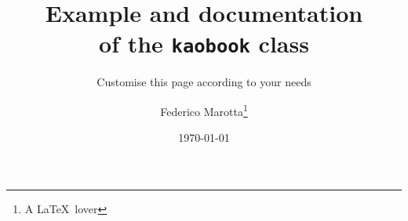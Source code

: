 \documentclass[
  6in,9in,         %
  fontsize=10pt,
  twoside=true,
  numbers=noenddot
]{kaobook}
\begin{document}

\titlehead{The \texttt{kaobook} class}
\subject{Use this document as a template}

\title[Example and documentation of the {\normalfont\texttt{kaobook}} class]{Example and documentation \\ of the {\normalfont\texttt{kaobook}} class}
\subtitle{Customise this page according to your needs}

\author[Federico Marotta]{Federico Marotta\thanks{A \LaTeX\ lover}}

\date{\today}

\publishers{An Awesome Publisher}


\frontmatter %




\makeatletter
\uppertitleback{\@titlehead} %
\end{document}
